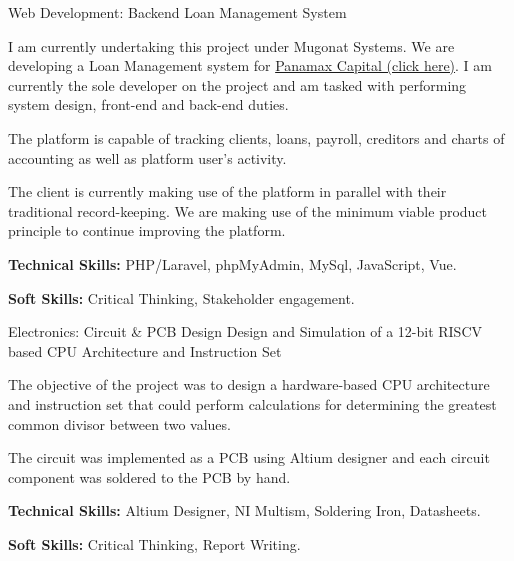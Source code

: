 \begin{cventries}
\cventry
            {Web Development: Backend}
		{Loan Management System}
		{}
            {}
		{
                \begin{cvitems}
                    \item 
                    {
                        I am currently undertaking this project under Mugonat Systems. We are developing a Loan Management system for \href{https://panamax.co.zw/}{Panamax Capital (click here)}. I am currently the sole developer on the project and am tasked with performing system design, front-end and back-end duties.
                    }
                    \item
                    {
                        The platform is capable of tracking clients, loans, payroll, creditors and charts of accounting as well as platform user's activity.
                    }
                     \item 
                    {
                        The client is currently making use of the platform in parallel with their traditional record-keeping. We are making use of the minimum viable product principle to continue improving the platform.
                   }
                   \item {\textbf{Technical Skills:} PHP/Laravel, phpMyAdmin, MySql, JavaScript, Vue.}
        \item {\textbf{Soft Skills:} Critical Thinking, Stakeholder engagement.}
                \end{cvitems}
            }
  \cventry
    {Electronics: Circuit \& PCB Design} %
    {Design and Simulation of a 12-bit RISCV based CPU Architecture and Instruction Set} %
    {} %
    {} %
    {
      \begin{cvitems} %
        \item {
            The objective of the project was to design a hardware-based CPU architecture and instruction set that could perform calculations for determining the greatest common divisor between two values.
        }
        \item {The circuit was implemented as a PCB using
        Altium designer and each circuit component was soldered to the PCB by hand.}
        \item {\textbf{Technical Skills:} Altium Designer, NI Multism, Soldering Iron, Datasheets.}
        \item {\textbf{Soft Skills:} Critical Thinking, Report Writing.}
      \end{cvitems}
    }

\end{cventries}

